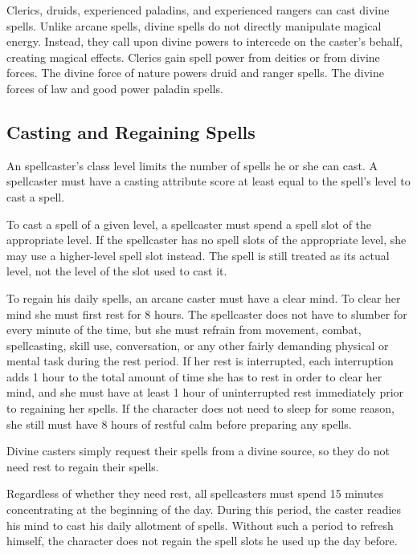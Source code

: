 Clerics, druids, experienced paladins, and experienced rangers can cast divine spells. Unlike arcane spells, divine spells do not directly manipulate magical energy. Instead, they call upon divine powers to intercede on the caster's behalf, creating magical effects. Clerics gain spell power from deities or from divine forces. The divine force of nature powers druid and ranger spells. The divine forces of law and good power paladin spells.

\subsection{Casting and Regaining Spells}
An spellcaster's class level limits the number of spells he or she can cast. A spellcaster must have a casting attribute score at least equal to the spell's level to cast a spell.

 To cast a spell of a given level, a spellcaster must spend a spell slot of the appropriate level. If the spellcaster has no spell slots of the appropriate level, she may use a higher-level spell slot instead. The spell is still treated as its actual level, not the level of the slot used to cast it. 

 To regain his daily spells, an arcane caster must have a clear mind. To clear her mind she must first rest for 8 hours. The spellcaster does not have to slumber for every minute of the time, but she must refrain from movement, combat, spellcasting, skill use, conversation, or any other fairly demanding physical or mental task during the rest period. If her rest is interrupted, each interruption adds 1 hour to the total amount of time she has to rest in order to clear her mind, and she must have at least 1 hour of uninterrupted rest immediately prior to regaining her spells. If the character does not need to sleep for some reason, she still must have 8 hours of restful calm before preparing any spells.

Divine casters simply request their spells from a divine source, so they do not need rest to regain their spells.

 Regardless of whether they need rest, all spellcasters must spend 15 minutes concentrating at the beginning of the day. During this period, the caster readies his mind to cast his daily allotment of spells. Without such a period to refresh himself, the character does not regain the spell slots he used up the day before.

